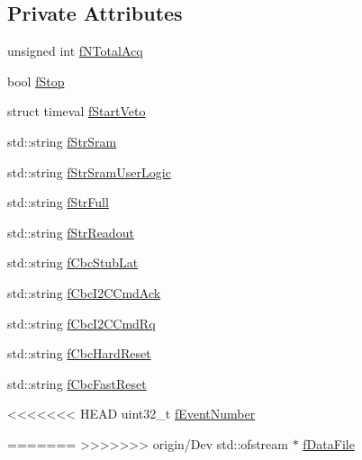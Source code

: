 \subsection*{Private Attributes}
\begin{DoxyCompactItemize}
\item 
unsigned int \hyperlink{class_ph2___hw_interface_1_1_glib_interface_a1b8fe11933c22b5c97e23ad2c4e4407c}{f\-N\-Total\-Acq}
\item 
bool \hyperlink{class_ph2___hw_interface_1_1_glib_interface_a0cc29dcdff019e8b11ea8ebab631159e}{f\-Stop}
\item 
struct timeval \hyperlink{class_ph2___hw_interface_1_1_glib_interface_a056c3192477cbd07c67ff822bc7123de}{f\-Start\-Veto}
\item 
std\-::string \hyperlink{class_ph2___hw_interface_1_1_glib_interface_a9e24a95e6ba16076ef8fbea1c96243f4}{f\-Str\-Sram}
\item 
std\-::string \hyperlink{class_ph2___hw_interface_1_1_glib_interface_a27b44db1be7f8a3802ba1a5d675a9888}{f\-Str\-Sram\-User\-Logic}
\item 
std\-::string \hyperlink{class_ph2___hw_interface_1_1_glib_interface_a40299b584632b402f3c54fc9d98d87f2}{f\-Str\-Full}
\item 
std\-::string \hyperlink{class_ph2___hw_interface_1_1_glib_interface_a925d65d022d0dc6d453e0e611826c377}{f\-Str\-Readout}
\item 
std\-::string \hyperlink{class_ph2___hw_interface_1_1_glib_interface_aa72b2c10537eb001fe5bd7ee611b2d57}{f\-Cbc\-Stub\-Lat}
\item 
std\-::string \hyperlink{class_ph2___hw_interface_1_1_glib_interface_ae9ec903a2dd264ad800292d7c3aa3d2b}{f\-Cbc\-I2\-C\-Cmd\-Ack}
\item 
std\-::string \hyperlink{class_ph2___hw_interface_1_1_glib_interface_a413443d88da98de71c5fcfa998ea89b5}{f\-Cbc\-I2\-C\-Cmd\-Rq}
\item 
std\-::string \hyperlink{class_ph2___hw_interface_1_1_glib_interface_a3c87ad019e3df02833d10cf653b4e1eb}{f\-Cbc\-Hard\-Reset}
\item 
std\-::string \hyperlink{class_ph2___hw_interface_1_1_glib_interface_a3f6d3aec340c12329fe26242de9b9577}{f\-Cbc\-Fast\-Reset}
\item 
<<<<<<< HEAD
uint32\-\_\-t \hyperlink{class_ph2___hw_interface_1_1_glib_interface_ae7d9a0ed785d3779c22757377c74f0bc}{f\-Event\-Number}
\item 
=======
>>>>>>> origin/Dev
std\-::ofstream $\ast$ \hyperlink{class_ph2___hw_interface_1_1_glib_interface_a6efc2da55aafca870e1259e78436e1ef}{f\-Data\-File}
\end{DoxyCompactItemize}

